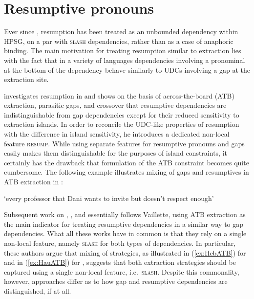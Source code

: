 \documentclass[output=paper,biblatex,babelshorthands,newtxmath,draftmode,colorlinks,citecolor=brown]{langscibook}
\begin{document}
\section{Resumptive pronouns}
\label{sec:UDC:ResumptivePronouns}

Ever since \citet{Vaillette:01}, resumption has been treated as an
unbounded dependency within HPSG, on a par with \textsc{slash}
dependencies, rather than as a case of anaphoric binding. The main
motivation for treating resumption similar to extraction lies with the
fact that in a variety of languages dependencies involving a
pronominal at the bottom of the dependency behave similarly to UDCs
involving a gap at the extraction site.

\citet{Vaillette:01} investigates resumption in  and shows on
the basis of across-the-board (ATB) extraction, parasitic gaps, and
crossover that resumptive dependencies are indistinguishable from gap
dependencies except for their reduced sensitivity to extraction
islands. In order to reconcile the UDC-like properties of resumption
with the difference in island sensitivity, he introduces a dedicated
non-local feature \textsc{resump}. While using separate features for
resumptive pronouns and gaps easily makes them distinguishable for the
purposes of island constraints, it certainly has the drawback that
formulation of the ATB constraint becomes quite cumbersome.
The following example illustrates mixing of gaps and resumptives in
ATB extraction in : 

\begin{exe}
\ex \label{ex:HebATB}{
\glt `every professor that Dani wants to invite but doesn't respect enough'
}
\end{exe}

\noindent
Subsequent work on  \citep{Taghvaipour2005a},  \citep{Crysmann:12}, and 
\citep{Borsley:13} essentially follows
Vaillette, using ATB extraction as the main indicator for treating
resumptive dependencies in a similar way to gap dependencies. What all these
works have in common is that they rely on a single non-local
feature, namely \textsc{slash} for both types of dependencies. In
particular, these authors argue that mixing of strategies, as
illustrated in (\ref{ex:HebATB}) for  and in (\ref{ex:HauATB})
for , suggests that both extraction
strategies should be captured using a single non-local feature,
i.e.\ \textsc{slash}. Despite this commonality, however, approaches
differ as to how gap and resumptive dependencies are distinguished, if
at all.
\end{document}

